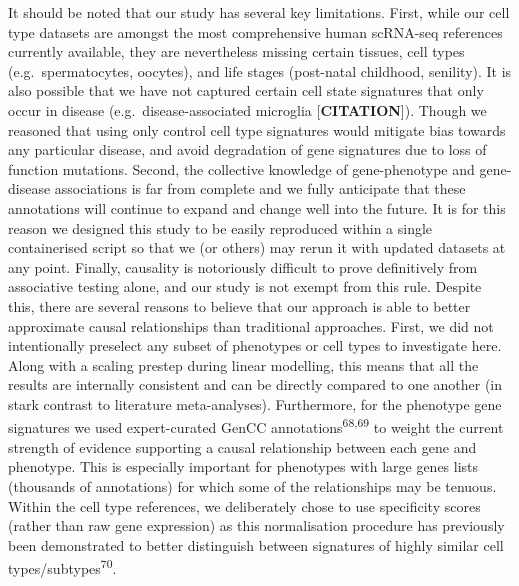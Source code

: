 \documentclass[
sn-nature
]{sn-jnl}
\begin{document}
It should be noted that our study has several key limitations. First,
while our cell type datasets are amongst the most comprehensive human
scRNA-seq references currently available, they are nevertheless missing
certain tissues, cell types (e.g.~spermatocytes, oocytes), and life
stages (post-natal childhood, senility). It is also possible that we
have not captured certain cell state signatures that only occur in
disease (e.g.~disease-associated microglia {[}\textbf{CITATION}{]}).
Though we reasoned that using only control cell type signatures would
mitigate bias towards any particular disease, and avoid degradation of
gene signatures due to loss of function mutations. Second, the
collective knowledge of gene-phenotype and gene-disease associations is
far from complete and we fully anticipate that these annotations will
continue to expand and change well into the future. It is for this
reason we designed this study to be easily reproduced within a single
containerised script so that we (or others) may rerun it with updated
datasets at any point. Finally, causality is notoriously difficult to
prove definitively from associative testing alone, and our study is not
exempt from this rule. Despite this, there are several reasons to
believe that our approach is able to better approximate causal
relationships than traditional approaches. First, we did not
intentionally preselect any subset of phenotypes or cell types to
investigate here. Along with a scaling prestep during linear modelling,
this means that all the results are internally consistent and can be
directly compared to one another (in stark contrast to literature
meta-analyses). Furthermore, for the phenotype gene signatures we used
expert-curated GenCC annotations\textsuperscript{68,69} to weight the
current strength of evidence supporting a causal relationship between
each gene and phenotype. This is especially important for phenotypes
with large genes lists (thousands of annotations) for which some of the
relationships may be tenuous. Within the cell type references, we
deliberately chose to use specificity scores (rather than raw gene
expression) as this normalisation procedure has previously been
demonstrated to better distinguish between signatures of highly similar
cell types/subtypes\textsuperscript{70}.
\end{document}
